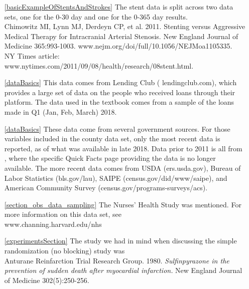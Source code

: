 \begin{itemize}
\item[\ref{basicExampleOfStentsAndStrokes}]
    The stent data is split across two data sets,
    one for the 0-30 day and one for the 0-365 day results. \\
    Chimowitz MI, Lynn MJ, Derdeyn CP, et al. 2011.
    Stenting versus Aggressive Medical Therapy for
    Intracranial Arterial Stenosis.
    New England Journal of Medicine 365:993-1003.
        {www.nejm.org/doi/full/10.1056/NEJMoa1105335}. \\
    NY Times article:
        {www.nytimes.com/2011/09/08/health/research/08stent.html}.

\item[\ref{dataBasics}]
    This data comes from Lending Club
    (
        {lendingclub.com}),
    which provides a large set of data on the people who
    received loans through their platform.
    The data used in the textbook comes from a sample
    of the loans made in Q1 (Jan, Feb, March) 2018.
\item[\ref{dataBasics}]
    These data come from several government sources.
    For those variables included in the
    county data set, only the most recent data is reported,
    as of what was available in late 2018.
    Data prior to 2011 is all from
    ,
    where the specific Quick Facts page providing the data
    is no longer available.
    The more recent data comes from
        {USDA (ers.usda.gov)},
        {Bureau of Labor Statistics (bls.gov/lau)},
        {SAIPE (census.gov/did/www/saipe)},
    and
        {American Community Survey
            (census.gov/programs-surveys/acs)}.

\item[\ref{section_obs_data_sampling}]
    The Nurses' Health Study was mentioned.
    For more information on this data set, see \\
        {www.channing.harvard.edu/nhs}

\item[\ref{experimentsSection}]
    The study we had in mind when discussing the
    simple randomization (no blocking) study was \\
    Anturane Reinfarction Trial Research Group. 1980.
    \emph{Sulfinpyrazone in the prevention of sudden
    death after myocardial infarction.}
    New England Journal of Medicine 302(5):250-256.
\end{itemize}






